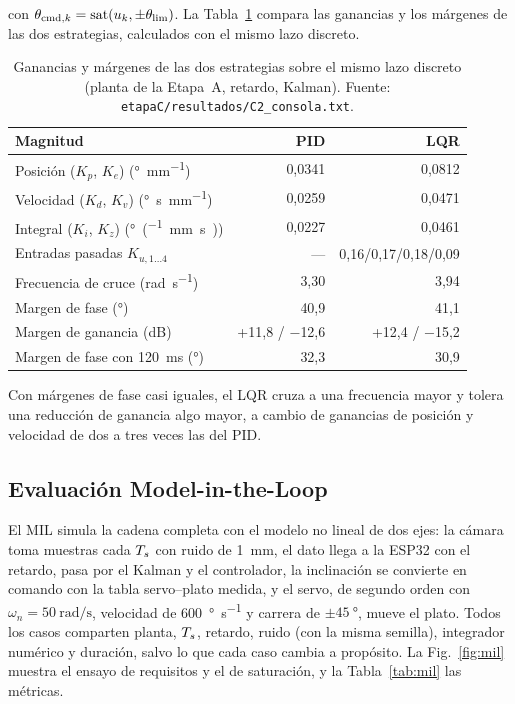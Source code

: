 con $\theta_{\mathrm{cmd},k} = \operatorname{sat}(u_k, \pm\theta_{\mathrm{lim}})$. La Tabla~\ref{tab:lqr} compara
las ganancias y los márgenes de las dos estrategias, calculados con el mismo lazo discreto.

\begin{table}[!t]
\caption{Ganancias y márgenes de las dos estrategias sobre el mismo lazo discreto (planta de la
Etapa~A, retardo, Kalman). Fuente: \texttt{etapaC/resultados/C2\_consola.txt}.}
\label{tab:lqr}
\centering
\footnotesize
\setlength{\tabcolsep}{3pt}
\begin{tabular}{@{}lrr@{}}
\toprule
\textbf{Magnitud} & \textbf{PID} & \textbf{LQR} \\
\midrule
Posición ($K_p$, $K_e$) (\si{\degree\per\milli\metre}) & 0,0341 & 0,0812 \\
Velocidad ($K_d$, $K_v$) (\si{\degree\second\per\milli\metre}) & 0,0259 & 0,0471 \\
Integral ($K_i$, $K_z$) (\si{\degree\per(\milli\metre\second)}) & 0,0227 & 0,0461 \\
Entradas pasadas $K_{u,1\dots4}$ & --- & 0,16/0,17/0,18/0,09 \\
Frecuencia de cruce (\si{\radian\per\second}) & 3,30 & 3,94 \\
Margen de fase (\si{\degree}) & 40,9 & 41,1 \\
Margen de ganancia (\si{\deci\bel}) & +11,8 / $-$12,6 & +12,4 / $-$15,2 \\
Margen de fase con \SI{120}{\milli\second} (\si{\degree}) & 32,3 & 30,9 \\
\bottomrule
\end{tabular}
\end{table}

Con márgenes de fase casi iguales, el LQR cruza a una frecuencia mayor y tolera una reducción de
ganancia algo mayor, a cambio de ganancias de posición y velocidad de dos a tres veces las del PID.

\subsection{Evaluación Model-in-the-Loop}

El MIL simula la cadena completa con el modelo no lineal de dos ejes: la cámara toma muestras
cada $T_s$ con ruido de \SI{1}{\milli\metre}, el dato llega a la ESP32 con el retardo, pasa por el
Kalman y el controlador, la inclinación se convierte en comando con la tabla servo--plato medida,
y el servo, de segundo orden con $\omega_n = \SI{50}{\radian\per\second}$, velocidad de
\SI{600}{\degree\per\second} y carrera de $\pm\SI{45}{\degree}$, mueve el plato. Todos los casos
comparten planta, $T_s$, retardo, ruido (con la misma semilla), integrador numérico y duración,
salvo lo que cada caso cambia a propósito. La Fig.~\ref{fig:mil} muestra el ensayo de requisitos
y el de saturación, y la Tabla~\ref{tab:mil} las métricas.


